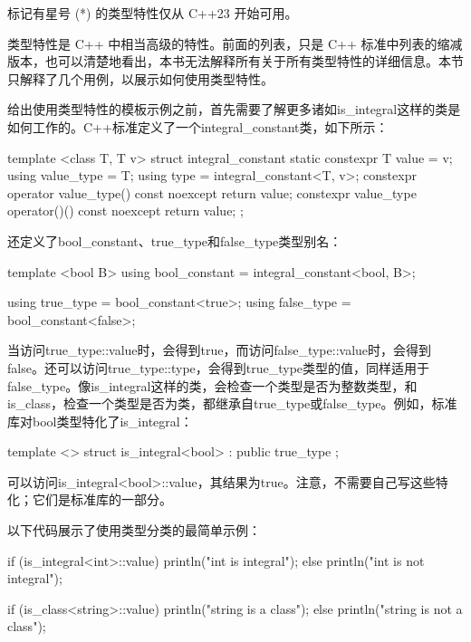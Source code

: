 标记有星号 (*) 的类型特性仅从 C++23 开始可用。

类型特性是 C++ 中相当高级的特性。前面的列表，只是 C++ 标准中列表的缩减版本，也可以清楚地看出，本书无法解释所有关于所有类型特性的详细信息。本节只解释了几个用例，以展示如何使用类型特性。


给出使用类型特性的模板示例之前，首先需要了解更多诸如is\_integral这样的类是如何工作的。C++标准定义了一个integral\_constant类，如下所示：

\begin{cpp}
template <class T, T v>
struct integral_constant {
    static constexpr T value = v;
    using value_type = T;
    using type = integral_constant<T, v>;
    constexpr operator value_type() const noexcept { return value; }
    constexpr value_type operator()() const noexcept { return value; }
};
\end{cpp}

还定义了bool\_constant、true\_type和false\_type类型别名：

\begin{cpp}
template <bool B>
using bool_constant = integral_constant<bool, B>;

using true_type = bool_constant<true>;
using false_type = bool_constant<false>;
\end{cpp}

当访问true\_type::value时，会得到true，而访问false\_type::value时，会得到false。还可以访问true\_type::type，会得到true\_type类型的值，同样适用于false\_type。像is\_integral这样的类，会检查一个类型是否为整数类型，和is\_class，检查一个类型是否为类，都继承自true\_type或false\_type。例如，标准库对bool类型特化了is\_integral：

\begin{cpp}
template <> struct is_integral<bool> : public true_type { };
\end{cpp}

可以访问is\_integral<bool>::value，其结果为true。注意，不需要自己写这些特化；它们是标准库的一部分。

以下代码展示了使用类型分类的最简单示例：

\begin{cpp}
if (is_integral<int>::value) { println("int is integral"); }
else { println("int is not integral"); }

if (is_class<string>::value) { println("string is a class"); }
else { println("string is not a class"); }
\end{cpp}

